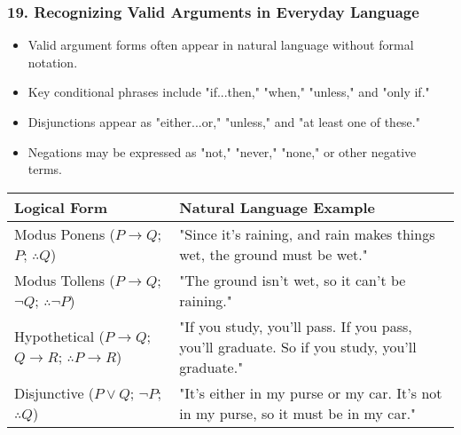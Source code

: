 \documentclass{beamer}
\begin{document}
\begin{frame}
\frametitle{19. Recognizing Valid Arguments in Everyday Language}
\begin{itemize}
\item Valid argument forms often appear in natural language without formal notation.
\item Key conditional phrases include "if...then," "when," "unless," and "only if."
\item Disjunctions appear as "either...or," "unless," and "at least one of these."
\item Negations may be expressed as "not," "never," "none," or other negative terms.
\end{itemize}

\begin{table}
\scriptsize
\begin{tabular}{|p{3cm}|p{7cm}|}
\hline
\textbf{Logical Form} & \textbf{Natural Language Example} \\
\hline
Modus Ponens ($P \rightarrow Q$; $P$; $\therefore Q$) & "Since it's raining, and rain makes things wet, the ground must be wet." \\
\hline
Modus Tollens ($P \rightarrow Q$; $\neg Q$; $\therefore \neg P$) & "The ground isn't wet, so it can't be raining." \\
\hline
Hypothetical ($P \rightarrow Q$; $Q \rightarrow R$; $\therefore P \rightarrow R$) & "If you study, you'll pass. If you pass, you'll graduate. So if you study, you'll graduate." \\
\hline
Disjunctive ($P \lor Q$; $\neg P$; $\therefore Q$) & "It's either in my purse or my car. It's not in my purse, so it must be in my car." \\
\hline
\end{tabular}
\end{table}
\end{frame}
\end{document}
